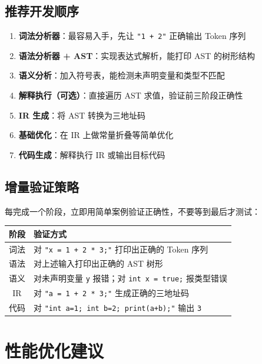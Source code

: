 \documentclass[12pt, a4paper]{ctexart}
\begin{document}
\subsection{推荐开发顺序}

\begin{keybox}
\begin{enumerate}
  \item \textbf{词法分析器}：最容易入手，先让 \texttt{"1 + 2"} 正确输出 Token 序列
  \item \textbf{语法分析器 + AST}：实现表达式解析，能打印 AST 的树形结构
  \item \textbf{语义分析}：加入符号表，能检测未声明变量和类型不匹配
  \item \textbf{解释执行（可选）}：直接遍历 AST 求值，验证前三阶段正确性
  \item \textbf{IR 生成}：将 AST 转换为三地址码
  \item \textbf{基础优化}：在 IR 上做常量折叠等简单优化
  \item \textbf{代码生成}：解释执行 IR 或输出目标代码
\end{enumerate}
\end{keybox}

\subsection{增量验证策略}

每完成一个阶段，立即用简单案例验证正确性，不要等到最后才测试：

\begin{center}
\renewcommand{\arraystretch}{1.4}
\begin{tabular}{cl}
\toprule
\textbf{阶段} & \textbf{验证方式} \\
\midrule
词法 & 对 \texttt{"x = 1 + 2 * 3;"} 打印出正确的 Token 序列 \\
语法 & 对上述输入打印出正确的 AST 树形 \\
语义 & 对未声明变量 \texttt{y} 报错；对 \texttt{int x = true;} 报类型错误 \\
IR   & 对 \texttt{"a = 1 + 2 * 3;"} 生成正确的三地址码 \\
代码 & 对 \texttt{"int a=1; int b=2; print(a+b);"} 输出 \texttt{3} \\
\bottomrule
\end{tabular}
\end{center}

\section{性能优化建议}
\end{document}
